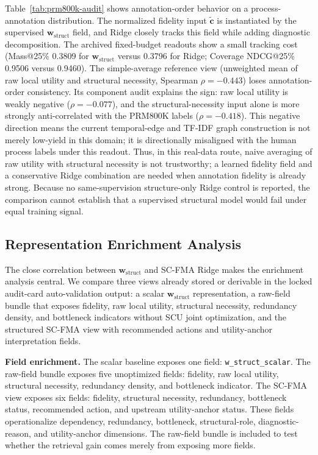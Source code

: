 \documentclass[a4paper,fleqn]{cas-sc}
\newcommand{\wstruct}{\ensuremath{\mathbf{w}_{\mathrm{struct}}}}
\begin{document}
Table~\ref{tab:prm800k-audit} shows annotation-order behavior on a process-annotation distribution. The normalized fidelity input $\tilde{\mathbf{c}}$ is instantiated by the supervised \wstruct{} field, and Ridge closely tracks this field while adding diagnostic decomposition. The archived fixed-budget readouts show a small tracking cost (Mass@25\% 0.3809 for \wstruct{} versus 0.3796 for Ridge; Coverage NDCG@25\% 0.9506 versus 0.9460). The simple-average reference view (unweighted mean of raw local utility and structural necessity, Spearman $\rho = -0.443$) loses annotation-order consistency. Its component audit explains the sign: raw local utility is weakly negative ($\rho=-0.077$), and the structural-necessity input alone is more strongly anti-correlated with the PRM800K labels ($\rho=-0.418$). This negative direction means the current temporal-edge and TF-IDF graph construction is not merely low-yield in this domain; it is directionally misaligned with the human process labels under this readout. Thus, in this real-data route, naive averaging of raw utility with structural necessity is not trustworthy; a learned fidelity field and a conservative Ridge combination are needed when annotation fidelity is already strong. Because no same-supervision structure-only Ridge control is reported, the comparison cannot establish that a supervised structural model would fail under equal training signal.

\subsection{Representation Enrichment Analysis}
\label{sec:representation-enrichment}

The close correlation between \wstruct{} and SC-FMA Ridge makes the enrichment analysis central. We compare three views already stored or derivable in the locked audit-card auto-validation output: a scalar \wstruct{} representation, a raw-field bundle that exposes fidelity, raw local utility, structural necessity, redundancy density, and bottleneck indicators without SCU joint optimization, and the structured SC-FMA view with recommended actions and utility-anchor interpretation fields.

\textbf{Field enrichment.} The scalar baseline exposes one field: \texttt{w\_struct\_scalar}. The raw-field bundle exposes five unoptimized fields: fidelity, raw local utility, structural necessity, redundancy density, and bottleneck indicator. The SC-FMA view exposes six fields: fidelity, structural necessity, redundancy, bottleneck status, recommended action, and upstream utility-anchor status. These fields operationalize dependency, redundancy, bottleneck, structural-role, diagnostic-reason, and utility-anchor dimensions. The raw-field bundle is included to test whether the retrieval gain comes merely from exposing more fields.
\end{document}
